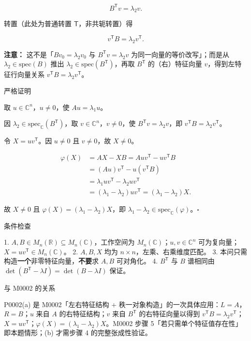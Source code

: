 \documentclass[
    lang=cn,
    color=blue,
    mode=fancy,
    thmcnt=section,
    scheme=chinese
]{elegantbook}
\begin{document}
\[
B^{\mathsf T}v=\lambda_2 v.
\]

转置（此处为普通转置 $\mathsf T$，非共轭转置）得

\[
v^{\mathsf T}B=\lambda_2 v^{\mathsf T}.
\]

\textbf{注意：} 这不是「$Bv_0=\lambda_2 v_0$ 与 $B^{\mathsf T}v=\lambda_2 v$ 为同一向量的等价改写」；而是从 $\lambda_2\in\mathrm{spec}(B)$ 推出 $\lambda_2\in\mathrm{spec}(B^{\mathsf T})$，再取 $B^{\mathsf T}$ 的（右）特征向量 $v$，得到左特征行向量关系 $v^{\mathsf T}B=\lambda_2 v^{\mathsf T}$。

严格证明

取 $u\in\mathbb{C}^n$，$u\neq 0$，使 $Au=\lambda_1 u$。

因 $\lambda_2\in\mathrm{spec}_{\mathbb{C}}(B^{\mathsf T})$，取 $v\in\mathbb{C}^n$，$v\neq 0$，使 $B^{\mathsf T}v=\lambda_2 v$，即 $v^{\mathsf T}B=\lambda_2 v^{\mathsf T}$。

令 $X=uv^{\mathsf T}$。因 $u\neq 0$ 且 $v\neq 0$，故 $X\neq 0$。

\[
\begin{aligned}
\varphi(X)&=AX-XB=Auv^{\mathsf T}-uv^{\mathsf T}B \\
&=(Au)v^{\mathsf T}-u(v^{\mathsf T}B) \\
&=\lambda_1 uv^{\mathsf T}-\lambda_2 uv^{\mathsf T} \\
&=(\lambda_1-\lambda_2)uv^{\mathsf T}=(\lambda_1-\lambda_2)X.
\end{aligned}
\]

故 $X\neq 0$ 且 $\varphi(X)=(\lambda_1-\lambda_2)X$，即 $\lambda_1-\lambda_2\in\mathrm{spec}_{\mathbb{C}}(\varphi)$。$\square$

条件检查

1. $A,B\in M_n(\mathbb{R})\subseteq M_n(\mathbb{C})$，工作空间为 $M_n(\mathbb{C})$；$u,v\in\mathbb{C}^n$ 可为复向量；$X=uv^{\mathsf T}\in M_n(\mathbb{C})$。
2. $A,B,X$ 均为 $n\times n$，左乘、右乘维度匹配。
3. 本问只需构造\textbf{一个}非零特征向量，\textbf{不要}求 $A,B$ 可对角化。
4. $B^{\mathsf T}$ 与 $B$ 谱相同由 $\det(B^{\mathsf T}-\lambda I)=\det(B-\lambda I)$ 保证。

与 M0002 的关系

P0002(a) 是 M0002「左右特征结构 + 秩一对象构造」的一次具体应用：$L=A$，$R=B$；$u$ 来自 $A$ 的右特征结构；$v$ 来自 $B^{\mathsf T}$ 的右特征向量以得到 $v^{\mathsf T}B=\lambda_2 v^{\mathsf T}$；$X=uv^{\mathsf T}$；$\varphi(X)=(\lambda_1-\lambda_2)X$。M0002 步骤 5「若只需单个特征值存在性」即本题情形；(b) 才需步骤 4 的完整张成性验证。
\end{document}
